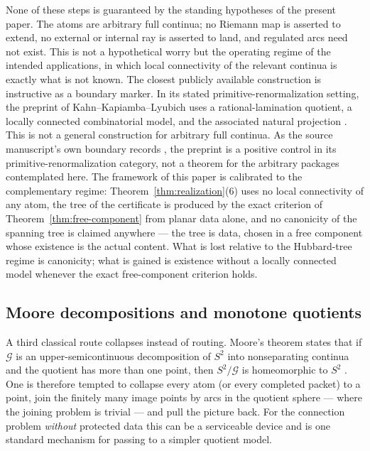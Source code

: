 None of these steps is guaranteed by the standing hypotheses of the
present paper.  The atoms are arbitrary full continua; no Riemann map is
asserted to extend, no external or internal ray is asserted to land, and
regulated arcs need not exist.  This is not a hypothetical worry but the
operating regime of the intended applications, in which local
connectivity of the relevant continua is exactly what is not known.  The
closest publicly available construction is instructive as a boundary
marker.  In its stated primitive-renormalization setting, the preprint of
Kahn--Kapiamba--Lyubich uses a rational-lamination quotient, a locally
connected combinatorial model, and the associated natural projection
\cite[\S\S2.5--2.6]{KKL26}.  This is not a general construction for
arbitrary full continua.  As the source manuscript's own boundary records
\cite{MWman}, the preprint is a positive control in its
primitive-renormalization category, not a theorem for the arbitrary
packages contemplated here.  The framework of this paper is
calibrated to the complementary regime: Theorem~\ref{thm:realization}(6)
uses no local connectivity of any atom, the tree of the certificate is
produced by the exact criterion of Theorem~\ref{thm:free-component} from
planar data alone, and no canonicity of the spanning tree is claimed
anywhere --- the tree is data, chosen in a free component whose existence
is the actual content.  What is lost relative to the Hubbard-tree regime
is canonicity; what is gained is existence without a locally connected
model whenever the exact free-component criterion holds.

\subsection{Moore decompositions and monotone quotients}
\label{subsec:A-comp-moore}

A third classical route collapses instead of routing.  Moore's theorem
states that if $\mathcal G$ is an upper-semicontinuous decomposition of
$S^2$ into nonseparating continua and the quotient has more than one
point, then $S^2/\mathcal G$ is homeomorphic to $S^2$ \cite{Moo25}.
One is therefore tempted to collapse every atom (or every
completed packet) to a point, join the finitely many image points by
arcs in the quotient sphere --- where the joining problem is trivial ---
and pull the picture back.  For the connection problem \emph{without}
protected data this can be a serviceable device and is one standard
mechanism for passing to a simpler quotient model.

